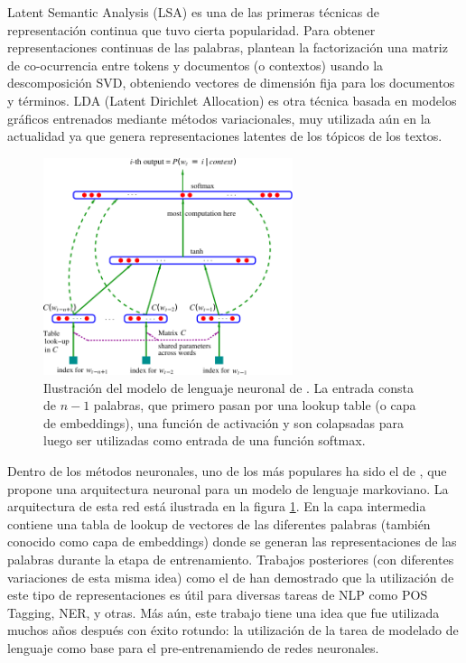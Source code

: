 Latent Semantic Analysis (LSA) \cite{landauer1997solution} es una de las primeras técnicas de representación continua que tuvo cierta popularidad. Para obtener representaciones continuas de las palabras, plantean la factorización una matriz de co-ocurrencia entre tokens y documentos (o contextos) usando la descomposición SVD, obteniendo vectores de dimensión fija para los documentos y términos. LDA (Latent Dirichlet Allocation) \cite{blei2003latent} es otra técnica basada en modelos gráficos entrenados mediante métodos variacionales, muy utilizada aún en la actualidad ya que genera representaciones latentes de los tópicos de los textos.

\begin{figure}
    \centering
    \includegraphics[width=0.65\textwidth]{img/02/bengio_neural_language_model.pdf}
    \caption{Ilustración del modelo de lenguaje neuronal de \citet{bengio2003neural}. La entrada consta de $n-1$ palabras, que primero pasan por una lookup table (o capa de embeddings), una función de activación y son colapsadas para luego ser utilizadas como entrada de una función softmax.}
    \label{fig:bengio_neural_language_model}

\end{figure}

Dentro de los métodos neuronales, uno de los más populares ha sido el de \citet{bengio2003neural}, que propone una arquitectura neuronal para un modelo de lenguaje markoviano. La arquitectura de esta red está ilustrada en la figura \ref{fig:bengio_neural_language_model}. En la capa intermedia contiene una tabla de lookup de vectores de las diferentes palabras (también conocido como capa de embeddings) donde se generan las representaciones de las palabras durante la etapa de entrenamiento. Trabajos posteriores (con diferentes variaciones de esta misma idea) como el de \citet{collobert2011natural} han demostrado que la utilización de este tipo de representaciones es útil para diversas tareas de NLP como POS Tagging, NER, y otras. Más aún, este trabajo tiene una idea que fue utilizada muchos años después con éxito rotundo: la utilización de la tarea de modelado de lenguaje como base para el pre-entrenamiendo de redes neuronales.

